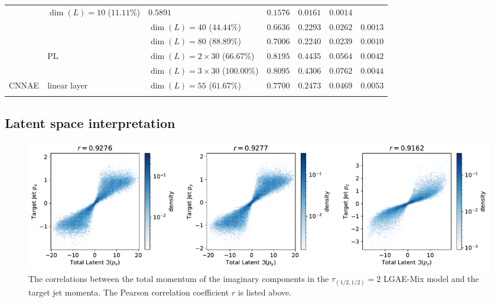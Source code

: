 \begin{table}[ht!]
{\begin{tabular}{llllccc }
                                     & $\dim(L) = 10$ ($11.11\%$)          & $0.5891$                             & $0.1576$          & $0.0161$                  & $\mathit{0.0014}$                                     \\
                                     &                                     & $\dim(L) = 40$ ($44.44\%$)           & $0.6636$          & $\mathit{0.2293}$         & $\mathit{0.0262}$         & $0.0013$                  \\
                                     &                                     & $\dim(L) = 80$ ($88.89\%$)           & $\mathit{0.7006}$ & $0.2240$                  & $0.0239$                  & $0.0010$                  \\[1mm]
                                     & \multirow{2}{*}{PL}
                                     & $\dim(L) = 2 \times 30$ ($66.67\%$) & $\mathbf{0.8195}$                    & $\mathit{0.4435}$ & $0.0564$                  & $0.0042$                                              \\
                                     &                                     & $\dim(L) = 3 \times 30$ ($100.00\%$) & $0.8095$          & $0.4306$                  & $\mathit{0.0762}$         & $\mathit{0.0044}$         \\[2mm]
       CNNAE & linear layer
       & $\dim(L) = 55$ ($61.67\%$)
       & $0.7700$
       & $0.2473$
       & $0.0469$
       & $0.0053$ \\
        \cbottomrule
    \end{tabular}
    }
\end{table}


\subsection{Latent space interpretation}
\label{sec:06_lgae_latent-analysis}

\begin{figure}[ht!]
    \centering
    \includegraphics[width=\linewidth]{figures/06-ML4Jets/lgae/latent-space-analysis/corr.pdf}
    \caption{The correlations between the total momentum of the imaginary components in the $\tau_{(1/2, 1/2)} = 2$ LGAE-Mix model and the target jet momenta.
        The Pearson correlation coefficient $r$ is listed above.
    }
    \label{fig:06_lgae_correlations}
\end{figure}

